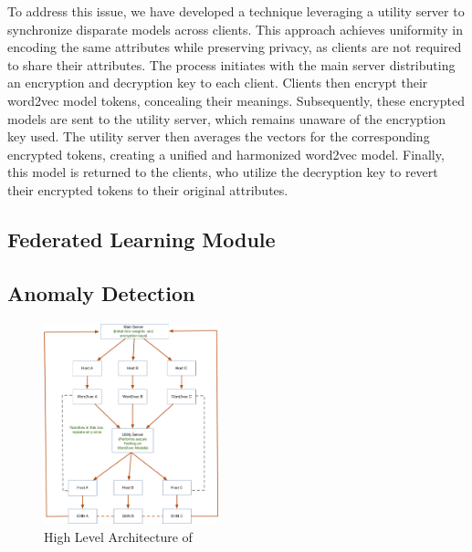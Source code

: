 To address this issue, we have developed a technique leveraging a utility server to synchronize disparate models across clients. This approach achieves uniformity in encoding the same attributes while preserving privacy, as clients are not required to share their attributes. The process initiates with the main server distributing an encryption and decryption key to each client. Clients then encrypt their word2vec model tokens, concealing their meanings. Subsequently, these encrypted models are sent to the utility server, which remains unaware of the encryption key used. The utility server then averages the vectors for the corresponding encrypted tokens, creating a unified and harmonized word2vec model. Finally, this model is returned to the clients, who utilize the decryption key to revert their encrypted tokens to their original attributes.

\subsection{Federated Learning Module}

\subsection{Anomaly Detection}


\begin{figure}[t!]
    \centering
    \includegraphics[width=0.45\textwidth]{fig/arch.pdf}
    \caption{High Level Architecture of \Sys}
    \vspace{-3ex}
    \label{arch}
  \end{figure}
